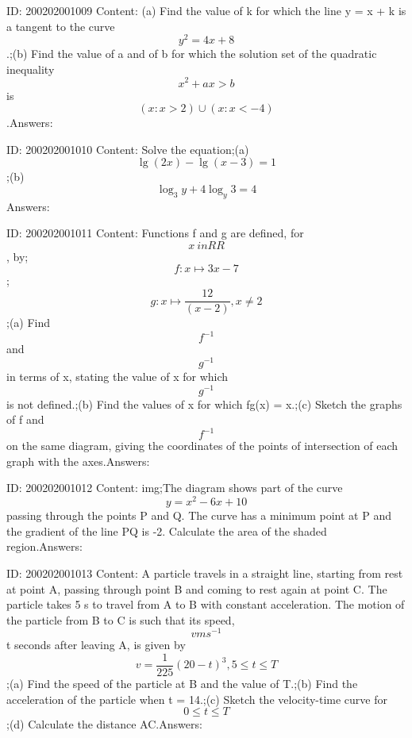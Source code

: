 \documentclass{article}
\begin{document}
ID: 200202001009
Content:
(a)	Find the value of k for which the line y = x + k is a tangent to the curve $$y^2=4x+8$$.;(b)	Find the value of a and of b for which the solution set of the quadratic inequality $$x^2+ax>b$$ is $$(x:x>2) \cup (x:x<-4)$$.Answers:

ID: 200202001010
Content:
Solve the equation;(a) $$\lg (2x) - \lg (x - 3) = 1$$;(b) $$\log_3y+4\log_y3=4$$Answers:

ID: 200202001011
Content:
Functions f and g are defined, for $$x\ in RR$$, by;$$f: x \mapsto3x-7$$;$$g: x \mapsto \frac{12}{(x-2)},x\neq2$$;(a) Find $$f^{-1}$$ and $$g^{-1}$$ in terms of x, stating the value of x for which $$g^{-1}$$ is not defined.;(b) Find the values of x for which fg(x) = x.;(c) Sketch the graphs of f and $$f^{-1}$$ on the same diagram, giving the coordinates of the points of intersection of each graph with the axes.Answers:

ID: 200202001012
Content:
img;The diagram shows part of the curve $$y=x^2-6x+10$$ passing through the points P and Q. The curve has a minimum point at P and the gradient of the line PQ is -2. Calculate the area of the shaded region.Answers:

ID: 200202001013
Content:
A particle travels in a straight line, starting from rest at point A, passing through point B and coming to rest again at point C. The particle takes 5 s to travel from A to B with constant acceleration. The motion of the particle from B to C is such that its speed, \[v ms^{-1}\] t seconds after leaving A, is given by $$v=\frac{1}{225}(20-t)^3, 5\leq t\leq T$$;(a)	Find the speed of the particle at B and the value of T.;(b)	Find the acceleration of the particle when t = 14.;(c)	Sketch the velocity-time curve for $$0\leq t\leq T$$;(d)	Calculate the distance AC.Answers:
\end{document}
